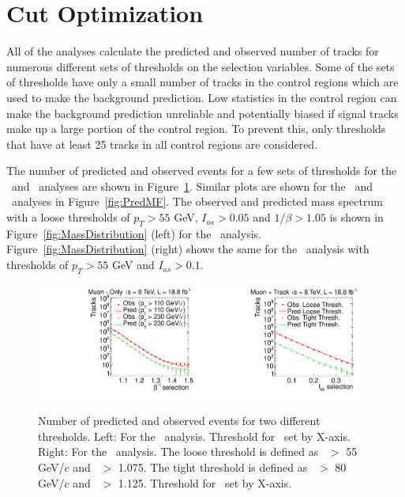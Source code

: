 \section{Cut Optimization \label{sec:Optim}}
All of the analyses calculate the predicted and observed number of tracks for numerous different sets of thresholds on the selection variables.
Some of the sets of thresholds have only a small number of tracks in the control regions which are used to make the background prediction.
Low statistics in the control region can make the background prediction unreliable and potentially biased if signal tracks make up a large portion of the control region.
To prevent this, only thresholds that have at least 25 tracks in all control regions are considered. 

The number of predicted and observed events for a few sets of thresholds for the \muononly\ and \tktof\ analyses are shown in Figure~\ref{fig:PredPt230}. 
Similar plots are shown for the \tkonly\ and \multi\ analyses in Figure~\ref{fig:PredMF}.
The observed and predicted mass spectrum with a loose thresholds of $p_T > 55$ GeV, $I_{as}>0.05$ and $1/\beta>1.05$ is shown in Figure~\ref{fig:MassDistribution} (left)
for the \tktof\ analysis. Figure~\ref{fig:MassDistribution} (right) shows the same for the \tkonly\ analysis with thresholds of $p_T > 55$ GeV and $I_{as}>0.1$.

\begin{figure}
\centering
  \includegraphics[clip=false, trim=0.0cm 0cm 0.0cm 0cm, width=0.48\textwidth]{figures/muonly/Prediction_Data8TeV_NPredVsNObs}
  \includegraphics[clip=false, trim=0.0cm 0cm 0.0cm 0cm, width=0.48\textwidth]{figures/tkmu/Prediction_Data8TeV_NPredVsNObs}
  \caption[Number of predicted and observed events for two different thresholds in the \muononly\ and \tktof\ analyses.]
{Number of predicted and observed events for two different thresholds. 
Left: For the \muononly\ analysis. Threshold for \invbeta\ set by X-axis.
Right: For the \tktof\ analysis. The loose threshold is defined as \pt\ $>$ 55 GeV/$c$ and \invbeta\ $>$ 1.075.
The tight threshold is defined as \pt\ $>$ 80 GeV/$c$ and \invbeta\ $>$ 1.125.  Threshold for \ias\ set by X-axis.}
    \label{fig:PredPt230}
\end{figure}


